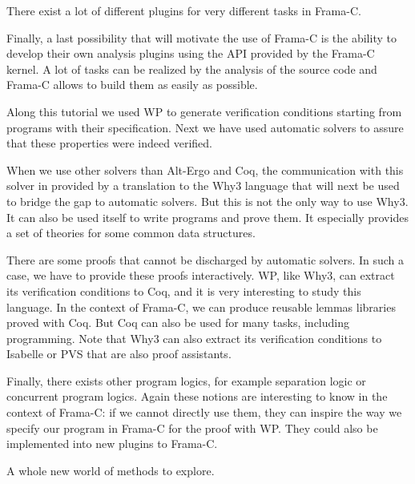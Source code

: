 There exist a lot of different plugins for very different tasks in Frama-C.

Finally, a last possibility that will motivate the use of Frama-C is the
ability to develop their own analysis plugins using the API provided by
the Frama-C kernel. A lot of tasks can be realized by the analysis of
the source code and Frama-C allows to build them as easily as possible.




Along this tutorial we used WP to generate verification conditions starting
from programs with their specification. Next we have used automatic
solvers to assure that these properties were indeed verified.

When we use other solvers than Alt-Ergo and Coq, the communication with
this solver in provided by a translation to the Why3 language that will
next be used to bridge the gap to automatic solvers. But this is not the
only way to use Why3. It can also be used itself to write programs and
prove them. It especially provides a set of theories for some common
data structures.

There are some proofs that cannot be discharged by automatic solvers. In
such a case, we have to provide these proofs interactively. WP, like
Why3, can extract its verification conditions to Coq, and it is very
interesting to study
this language. In the context of Frama-C, we can produce reusable lemmas
libraries proved with Coq. But Coq can also be used for many
tasks, including programming. Note that Why3 can also extract
its verification conditions to Isabelle or PVS that are also proof assistants.

Finally, there exists other program logics, for example separation logic
or concurrent program logics. Again these notions are interesting to know
in the context of Frama-C: if we cannot directly use them, they can
inspire the way we specify our program in Frama-C for the proof with WP.
They could also be implemented into new plugins to Frama-C.

A whole new world of methods to explore.
